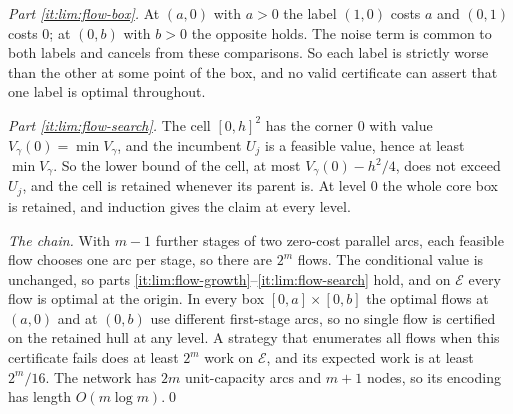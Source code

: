 \emph{Part \ref{it:lim:flow-box}.} At $(a,0)$ with $a>0$ the label $(1,0)$
costs $a$ and $(0,1)$ costs $0$; at $(0,b)$ with $b>0$ the opposite holds.
The noise term is common to both labels and cancels from these comparisons.
So each label is strictly worse than the other at some point of the box,
and no valid certificate can assert that one label is optimal throughout.

\emph{Part \ref{it:lim:flow-search}.} The cell $[0,h]^2$ has the corner $0$
with value $V_\gamma(0)=\min V_\gamma$, and the incumbent $U_j$ is a
feasible value, hence at least $\min V_\gamma$. So the lower bound of the
cell, at most $V_\gamma(0)-h^2/4$, does not exceed $U_j$, and the cell is
retained whenever its parent is. At level $0$ the whole core box is
retained, and induction gives the claim at every level.

\emph{The chain.} With $m-1$ further stages of two zero-cost parallel arcs,
each feasible flow chooses one arc per stage, so there are $2^m$ flows. The
conditional value is unchanged, so parts
\ref{it:lim:flow-growth}--\ref{it:lim:flow-search} hold, and on
$\mathcal E$ every flow is optimal at the origin. In every box
$[0,a]\times[0,b]$ the optimal flows at $(a,0)$ and at $(0,b)$ use
different first-stage arcs, so no single flow is certified on the retained
hull at any level. A strategy that enumerates all flows when this
certificate fails does at least $2^m$ work on $\mathcal E$, and its
expected work is at least $2^m/16$. The network has $2m$ unit-capacity arcs
and $m+1$ nodes, so its encoding has length $O(m\log m)$.\qed
